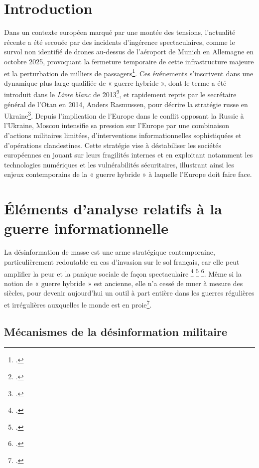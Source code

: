 \documentclass[12pt,a4paper]{article}
\begin{document}
\section{Introduction}
Dans un contexte européen marqué par une montée des tensions, l'actualité récente a été secouée par des incidents d'ingérence spectaculaires, comme le survol non identifié de drones au-dessus de l'aéroport de Munich en Allemagne en octobre 2025, provoquant la fermeture temporaire de cette infrastructure majeure et la perturbation de milliers de passagers\footcite{lefigaro2025munichdrones}. Ces événements s'inscrivent dans une dynamique plus large qualifiée de « guerre hybride », dont le terme a été introduit dans le \textit{Livre blanc} de 2013\footcite{livreblanc2013defense}, et rapidement repris par le secrétaire général de l'Otan en 2014, Anders Rasmussen, pour décrire la stratégie russe en Ukraine\footcite{tenenbaum2016guerre}.
Depuis l'implication de l'Europe dans le conflit opposant la Russie à l'Ukraine, Moscou intensifie sa pression sur l'Europe par une combinaison d'actions militaires limitées, d'interventions informationnelles sophistiquées et d'opérations clandestines. Cette stratégie vise à déstabiliser les sociétés européennes en jouant sur leurs fragilités internes et en exploitant notamment les technologies numériques et les vulnérabilités sécuritaires, illustrant ainsi les enjeux contemporains de la « guerre hybride » à laquelle l'Europe doit faire face.

\newpage

\section{Éléments d'analyse relatifs à la guerre informationnelle}
La désinformation de masse est une arme stratégique contemporaine, particulièrement redoutable en cas d'invasion sur le sol français, car elle peut amplifier la peur et la panique sociale de façon spectaculaire \footcite{garrigou2025desinformation} \footcite{ministere2025infox} \footcite{tf1info2025desinformation}.
Même si la notion de « guerre hybride » est ancienne, elle n'a cessé de muer à mesure des siècles, pour devenir aujourd'hui un outil à part entière dans les guerres régulières et irrégulières auxquelles le monde est en proie\footcite{tenenbaum2016guerre}.

\subsection{Mécanismes de la désinformation militaire}
\end{document}
